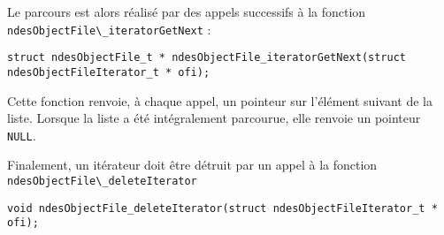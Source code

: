    Le parcours est alors réalisé par des appels successifs à la
fonction \lstinline{ndesObjectFile\_iteratorGetNext} :

\begin{verbatim}
struct ndesObjectFile_t * ndesObjectFile_iteratorGetNext(struct ndesObjectFileIterator_t * ofi);
\end{verbatim}

   Cette fonction renvoie, à chaque appel, un pointeur sur l'élément
suivant de la liste. Lorsque la liste a été intégralement parcourue,
elle renvoie un pointeur {\tt NULL}.

   Finalement, un itérateur doit être détruit par un appel à la
fonction \lstinline{ndesObjectFile\_deleteIterator}

\begin{verbatim}
void ndesObjectFile_deleteIterator(struct ndesObjectFileIterator_t * ofi);
\end{verbatim}
